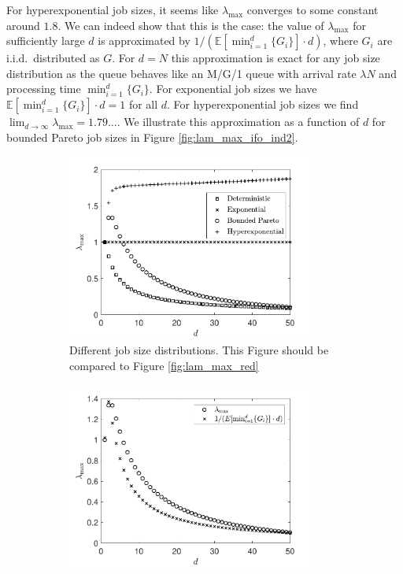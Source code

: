 \documentclass[12pt]{report}
\begin{document}
For hyperexponential job sizes, it seems like $\lambda_{\max}$ converges to some constant around $1.8$. We can indeed show that this is the case: the value of $\lambda_{\max}$ for sufficiently large $d$ is approximated by $1/(\mathbb{E}[\min_{i=1}^d \{ G_i\}] \cdot d)$, where $G_i$ are i.i.d.~distributed as $G$. For $d=N$ this approximation is exact for any job size distribution as the queue behaves like an M/G/1 queue with arrival rate $\lambda N$ and processing time $\min_{i=1}^d \{ G_i\}$. For exponential job sizes we have $\mathbb{E}[\min_{i=1}^d \{ G_i\}] \cdot d=1$ for all $d$. For hyperexponential job sizes we find $\lim_{d\rightarrow \infty} \lambda_{\max} = 1.79\dots$. We illustrate this approximation as a function of $d$ for bounded Pareto job sizes in Figure \ref{fig:lam_max_ifo_ind2}.
\begin{figure}[t]
\begin{subfigure}{.45\textwidth}
\begin{center}
\includegraphics[width=0.9\textwidth]{figures/Chapter3/plot_ifo_d1_independent.pdf}
\caption{Different job size distributions. This Figure should be compared to Figure \ref{fig:lam_max_red}}
\label{fig:lam_max_ifo_ind1}
\end{center}
\end{subfigure}
\begin{subfigure}{.45\textwidth}
\begin{center}
\includegraphics[width=0.9\textwidth]{figures/Chapter3/plot_ifo_d2_independent.pdf}

\end{center}
\end{subfigure}
\end{figure}
\end{document}
